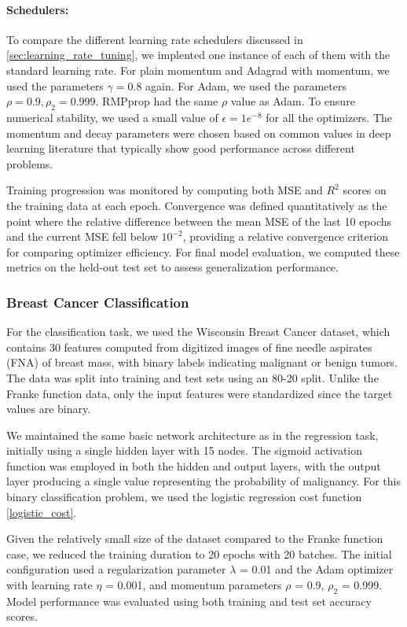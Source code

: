 \paragraph*{Schedulers:}\label{subsec:nn_schedulers}
To compare the different learning rate schedulers discussed in \cref{sec:learning_rate_tuning}, we implented one instance of each of them with the standard learning rate. For plain momentum and Adagrad with momentum, we used the parameters \( \gamma = 0.8 \) again. For Adam, we used the parameters \( \rho = 0.9, \rho_2 = 0.999 \). RMPprop had the same \( \rho \) value as Adam. To ensure numerical stability, we used a small value of \( \epsilon = 1e^{-8} \) for all the optimizers. The momentum and decay parameters were chosen based on common values in deep learning literature that typically show good performance across different problems. %

Training progression was monitored by computing both MSE and \( R^2 \) scores on the training data at each epoch. Convergence was defined quantitatively as the point where the relative difference between the mean MSE of the last 10 epochs and the current MSE fell below \( 10^{-2} \), providing a relative convergence criterion for comparing optimizer efficiency. For final model evaluation, we computed these metrics on the held-out test set to assess generalization performance.
\subsubsection{Breast Cancer Classification}

For the classification task, we used the Wisconsin Breast Cancer dataset, which contains 30 features computed from digitized images of fine needle aspirates (FNA) of breast mass, with binary labels indicating malignant or benign tumors. The data was split into training and test sets using an 80-20 split. Unlike the Franke function data, only the input features were standardized since the target values are binary.

We maintained the same basic network architecture as in the regression task, initially using a single hidden layer with 15 nodes. The sigmoid activation function was employed in both the hidden and output layers, with the output layer producing a single value representing the probability of malignancy. For this binary classification problem, we used the logistic regression cost function \cref{logistic_cost}.

Given the relatively small size of the dataset compared to the Franke function case, we reduced the training duration to 20 epochs with 20 batches. The initial configuration used a regularization parameter \( \lambda \) = 0.01 and the Adam optimizer with learning rate \( \eta \) = 0.001, and momentum parameters \( \rho \) = 0.9, \( \rho_2 \) = 0.999. Model performance was evaluated using both training and test set accuracy scores.

